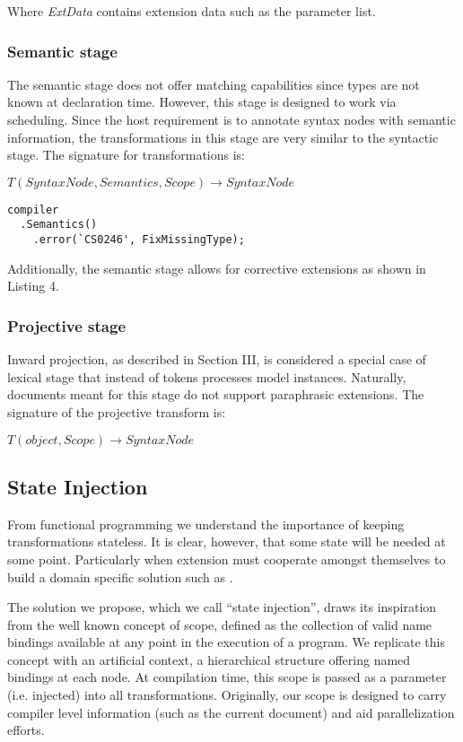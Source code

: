 \documentclass[conference]{IEEEtran}
\begin{document}
Where \textit{ExtData} contains extension data such as the parameter list.

\subsubsection{Semantic stage}

The semantic stage does not offer matching capabilities since types are not known at declaration time. However, this stage is designed to work via scheduling. Since the host  requirement is to annotate syntax nodes with semantic information, 
the transformations in this stage are very similar to the syntactic stage. The signature for transformations is:

$T(SyntaxNode, Semantics, Scope) \rightarrow SyntaxNode$ \\

\begin{lstlisting}[caption=Corrective Extension, captionpos= b, basicstyle=\small]
compiler
  .Semantics()
    .error(`CS0246', FixMissingType);
\end{lstlisting}

Additionally, the semantic stage allows for corrective extensions as shown in Listing 4.

\subsubsection{Projective stage}

Inward projection, as described in Section III, is considered a special case of lexical stage that instead of tokens processes model instances. Naturally, documents meant for this stage do not support paraphrasic extensions. The signature of the projective transform is:

$T(object, Scope) \rightarrow SyntaxNode$ \\

\subsection{State Injection }

From functional programming we understand the importance of keeping transformations stateless. It is clear, however, that some state will be needed at some point. Particularly when extension must cooperate amongst themselves to build a domain specific solution such as \cite{Sujeeth}.

The solution we propose, which we call “state injection”, draws its inspiration from the well known concept of scope, defined  as the collection of valid name bindings available at any point in the execution of a program. 
We replicate this concept with an artificial context, a hierarchical structure offering named bindings at each node. At compilation time, this scope is passed as a parameter (i.e. injected) into all transformations. 
Originally, our scope is designed to carry compiler level information (such as the current document) and aid parallelization efforts.
\end{document}
